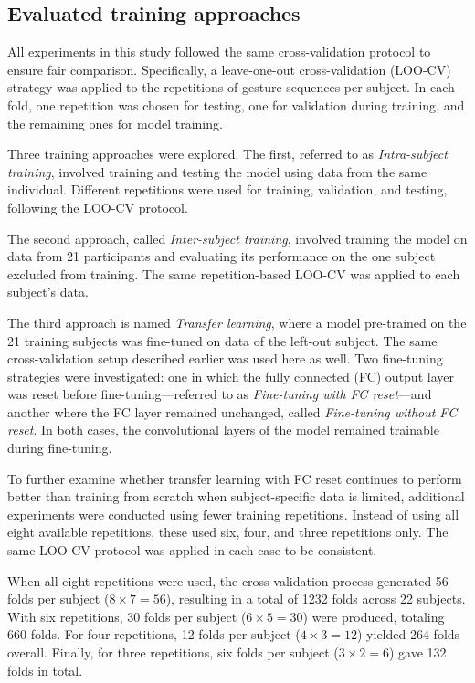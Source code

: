\begin{multicols}{2}

\subsection*{Evaluated training approaches}

All experiments in this study followed the same cross-validation protocol to ensure fair comparison. Specifically, a leave-one-out cross-validation (LOO-CV) strategy was applied to the repetitions of gesture sequences per subject. In each fold, one repetition was chosen for testing, one for validation during training, and the remaining ones for model training.

Three training approaches were explored. The first, referred to as \textit{Intra-subject training}, involved training and testing the model using data from the same individual. Different repetitions were used for training, validation, and testing, following the LOO-CV protocol.

The second approach, called \textit{Inter-subject training}, involved training the model on data from 21 participants and evaluating its performance on the one subject excluded from training. The same repetition-based LOO-CV was applied to each subject's data.

The third approach is named \textit{Transfer learning}, where a model pre-trained on the 21 training subjects was fine-tuned on data of the left-out subject. The same cross-validation setup described earlier was used here as well. Two fine-tuning strategies were investigated: one in which the fully connected (FC) output layer was reset before fine-tuning—referred to as \textit{Fine-tuning with FC reset}—and another where the FC layer remained unchanged, called \textit{Fine-tuning without FC reset}. In both cases, the convolutional layers of the model remained trainable during fine-tuning.

To further examine whether transfer learning with FC reset continues to perform better than training from scratch when subject-specific data is limited, additional experiments were conducted using fewer training repetitions. Instead of using all eight available repetitions, these used six, four, and three repetitions only. The same LOO-CV protocol was applied in each case to be consistent.

When all eight repetitions were used, the cross-validation process generated 56 folds per subject ($8 \times 7 = 56$), resulting in a total of 1232 folds across 22 subjects. With six repetitions, 30 folds per subject ($6 \times 5 = 30$) were produced, totaling 660 folds. For four repetitions, 12 folds per subject ($4 \times 3 = 12$) yielded 264 folds overall. Finally, for three repetitions, six folds per subject ($3 \times 2 = 6$) gave 132 folds in total.


\end{multicols}
